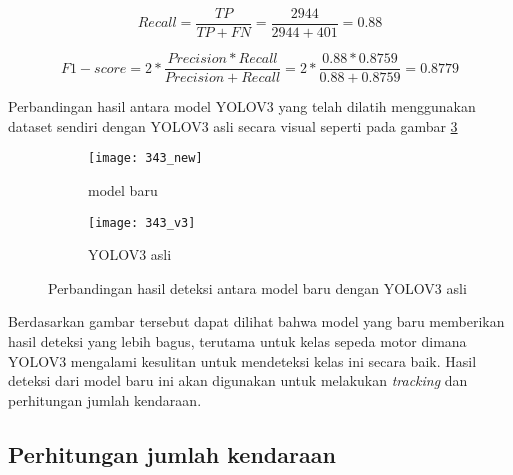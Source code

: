 \documentclass[../thesis.tex]{subfiles}
\begin{document}
\begin{equation} \label{Recall}
	Recall = \frac{TP}{TP+FN} = \frac{2944}{2944+401} = 0.88
\end{equation}

\begin{equation} \label{F1_score}
	F1-score = 2*\frac{Precision * Recall}{Precision + Recall} = 2*\frac{0.88 * 0.8759}{0.88 + 0.8759} = 0.8779
\end{equation}

Perbandingan hasil antara model YOLOV3 yang telah dilatih menggunakan dataset sendiri dengan YOLOV3 asli secara visual seperti pada gambar \ref{compare_result}
\begin{figure}[htp]
	\centering
	\begin{subfigure}{0.35\textwidth}
	  \texttt{[image: 343\_new]}
	  \caption{model baru}
	  \label{new_model_result}
	\end{subfigure}
	\begin{subfigure}{0.35\textwidth}
	  \texttt{[image: 343\_v3]}
	  \caption{YOLOV3 asli}
	  \label{V3_result}
	\end{subfigure}
	\caption{Perbandingan hasil deteksi antara model baru dengan YOLOV3 asli}
	\label{compare_result}
  \end{figure}
Berdasarkan gambar tersebut dapat dilihat bahwa model yang baru memberikan hasil deteksi yang lebih bagus, terutama untuk kelas sepeda motor dimana YOLOV3 mengalami kesulitan untuk mendeteksi kelas ini secara baik.
Hasil deteksi dari model baru ini akan digunakan untuk melakukan \textit{tracking} dan perhitungan jumlah kendaraan.

\subsection{Perhitungan jumlah kendaraan}
\end{document}
